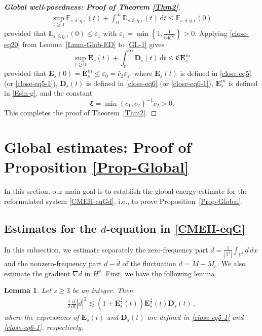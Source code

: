 \documentclass[reqno,11pt]{amsart}
\newtheorem{lemma}{Lemma}[section]
\numberwithin{equation}{section}
\def\d{\mathrm{d}}
\begin{document}
\begin{proof}[{\bf Global well-posedness: Proof of Theorem \ref{Thm2}}]
\begin{equation}
\begin{aligned}
        \sup_{t \geq 0} \mathbb{E}_{s;\delta, \eta, \epsilon} (t) + \int_{0}^{\infty} \mathbb{D}_{s;\delta, \eta, \epsilon} (t) \, \d t \leq \mathbb{E}_{s;\delta, \eta, \epsilon} (0)
    \end{aligned}
\end{equation}
provided that \( \mathbb{E}_{s;\delta, \eta, \epsilon} (0) \leq \varepsilon_{1} \) with \( \varepsilon_{1} = \min \left\{ 1, \frac{1}{64 C^{2}} \right\} > 0 \).
Applying \eqref{close-eq20} from Lemma~\ref{Lmm-Glob-ED} to \eqref{GL-1} gives
\[
\sup_{t \geq 0} \mathbf{E}_{s}(t) + \int_{0}^{\infty} \mathbf{D}_{s} (t) \, \d t \leq \mathfrak{C} \mathbf{E}_{s}^{in}
\]
provided that \( \mathbf{E}_{s}(0) = \mathbf{E}_{s}^{in} \leq \varepsilon_{0} = \hat{c}_2 \varepsilon_{1} \), where $\mathbf{E}_s (t)$ is defined in \eqref{close-eq5} (or \eqref{close-eq5-1}), $\mathbf{D}_s (t)$ is defined in \eqref{close-eq6} (or \eqref{close-eq6-1}), $\mathbf{E}_{s}^{in}$ is defined in \eqref{Esin-g}, and the constant
\[
\mathfrak{C} = \min \left\{ c_{1}, c_{2} \right\}^{-1} \hat{c}_2 > 0.
\]
This completes the proof of Theorem~\ref{Thm2}.
\end{proof}


\section{Global estimates: Proof of Proposition \ref{Prop-Global}}\label{Sec:Global-es}                         

In this section, our main goal is to establish the global energy estimate for the reformulated system \eqref{CMEH-eqGd}, i.e., to prove Proposition~\ref{Prop-Global}.                                                        

\subsection{Estimates for the $d$-equation in \eqref{CMEH-eqG}}

In this subsection, we estimate separately the zero-frequency part $\bar{d} = \frac{1}{|\mathbb{T}^3|}\int_{\mathbb{T}^3} d \, dx$ and the nonzero-frequency part $d - \bar{d}$ of the fluctuation $d = M - M_e$. We also estimate the gradient $\nabla d$ in $H^s$. First, we have the following lemma.

\begin{lemma}\label{Lmm-G1}
Let $s \geq 3$ be an integer. Then
\begin{equation}\label{d6}
\begin{aligned}  
\frac{1}{2} \frac{\d}{\d t} |\bar{d}|^2 \lesssim ( 1 + \mathbf{E}_s^\frac{1}{2} (t) ) \mathbf{E}_s^\frac{1}{2} (t) \mathbf{D}_s (t) \,,
\end{aligned}
\end{equation}
where the expressions of $\mathbf{E}_s (t)$ and $\mathbf{D}_s (t)$ are defined in \eqref{close-eq5-1} and \eqref{close-eq6-1}, respectively.
\end{lemma}
\end{document}

